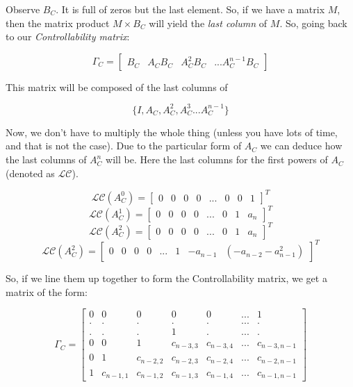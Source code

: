 \documentclass[10pt,a4paper]{article}
\begin{document}
Observe $B_{C}$. It is full of zeros but the last element. So, if we have a matrix $M$, then the matrix product $M \times B_{C}$ will yield the \textit{last column} of $M$. So, going back to our \textit{Controllability matrix}:

\[ \Gamma_{C} = 
\begin{bmatrix}
B_{C} & A_{C}B_{C} & A_{C}^{2}B_{C} & ... A_{C}^{n-1}B_{C}
\end{bmatrix}
\]

This matrix will be composed of the last columns of 

\[ \{ I, A_{C}, A^{2}_{C}, A^{3}_{C}...A^{n-1}_{C} \} \]

Now, we don't have to multiply the whole thing (unless you have lots of time, and that is not the case). Due to the particular form of $A_{C}$ we can deduce how the last columns of $A_{C}^{n}$ will be. Here the last columns for the first powers of $A_{C}$ (denoted as $\mathcal{LC}$). 

\[ \mathcal{LC}( A_{C}^{0} ) = 
\begin{bmatrix}
0 & 0 & 0 & 0 & ...& 0 & 0 & 1
\end{bmatrix}^{T}
\]
\[ \mathcal{LC}( A_{C}^{1} ) = 
\begin{bmatrix}
0 & 0 & 0 & 0 & ... & 0 & 1 & a_{n}
\end{bmatrix}^{T}
\]
\[ \mathcal{LC}( A_{C}^{2} ) = 
\begin{bmatrix}
0 & 0 & 0 & 0 & ... & 0 & 1 & a_{n}
\end{bmatrix}^{T}
\]
\[ \mathcal{LC}( A_{C}^{2} ) = 
\begin{bmatrix}
0 & 0 & 0 & 0 & ... & 1 & -a_{n-1} & (-a_{n-2} -a_{n-1}^{2})
\end{bmatrix}^{T}
\]

So, if we line them up together to form the Controllability matrix, we get a matrix of the form:

\[ \Gamma_{C} = 
\begin{bmatrix}
0 & 0 & 0 & 0 & 0 & ... & 1 \\
. & . & . & . & . & ... & . \\
. & . & . & 1 & . & ... & . \\
0 & 0 & 1 & c_{n-3,3} & c_{n-3,4} & ... & c_{n-3,n-1} \\
0 & 1 & c_{n-2,2} & c_{n-2,3} & c_{n-2,4} & ... & c_{n-2,n-1} \\
1 & c_{n-1,1} & c_{n-1,2} & c_{n-1,3} & c_{n-1,4} & ... & c_{n-1,n-1} 
\end{bmatrix}
\]
\end{document}
